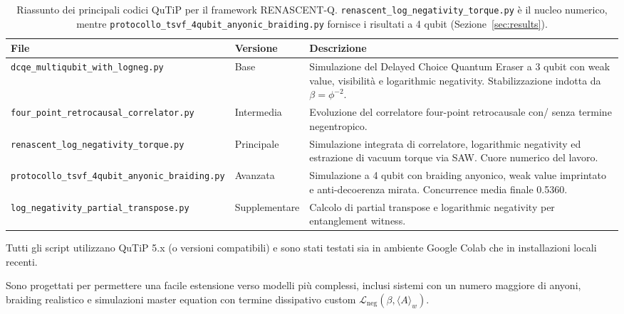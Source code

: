 \documentclass[11pt,a4paper]{article}
\let\oldref\ref
\renewcommand{\ref}{\protect\oldref}
\theoremstyle{plain}
\theoremstyle{definition}
\begin{document}
\begin{table}[H]
\centering
\small
\renewcommand{\arraystretch}{1.3}
\setlength{\tabcolsep}{5pt}
\begin{tabular}{l l p{6.8cm}}
\toprule
\textbf{File} & \textbf{Versione} & \textbf{Descrizione} \\
\midrule
\texttt{dcqe\_multiqubit\_with\_logneg.py} & Base & Simulazione del Delayed Choice Quantum Eraser a 3 qubit con weak value, visibilità e logarithmic negativity. Stabilizzazione indotta da \(\beta = \phi^{-2}\). \\

\texttt{four\_point\_retrocausal\_correlator.py} & Intermedia & Evoluzione del correlatore four-point retrocausale con/ senza termine negentropico. \\

\texttt{renascent\_log\_negativity\_torque.py} & Principale & Simulazione integrata di correlatore, logarithmic negativity ed estrazione di vacuum torque via SAW. Cuore numerico del lavoro. \\

\texttt{protocollo\_tsvf\_4qubit\_anyonic\_braiding.py} & Avanzata & Simulazione a 4 qubit con braiding anyonico, weak value imprintato e anti-decoerenza mirata. Concurrence media finale 0.5360. \\

\texttt{log\_negativity\_partial\_transpose.py} & Supplementare & Calcolo di partial transpose e logarithmic negativity per entanglement witness. \\
\bottomrule
\end{tabular}



\vspace{0.3cm}
\caption{Riassunto dei principali codici QuTiP per il framework RENASCENT-Q. \texttt{renascent\_log\_negativity\_torque.py} è il nucleo numerico, mentre \texttt{protocollo\_tsvf\_4qubit\_anyonic\_braiding.py} fornisce i risultati a 4 qubit (Sezione~\ref{sec:results}).}
\label{tab:codici_qutip}
\end{table}

\vspace{0.3cm}

Tutti gli script utilizzano QuTiP 5.x (o versioni compatibili) e sono stati testati sia in ambiente Google Colab che in installazioni locali recenti. 


\vspace{0.3cm}


Sono progettati per permettere una facile estensione verso modelli più complessi, inclusi sistemi con un numero maggiore di anyoni, braiding realistico e simulazioni master equation con termine dissipativo custom \(\mathcal{L}_{\text{neg}}(\beta, \langle A \rangle_w)\).
\end{document}
